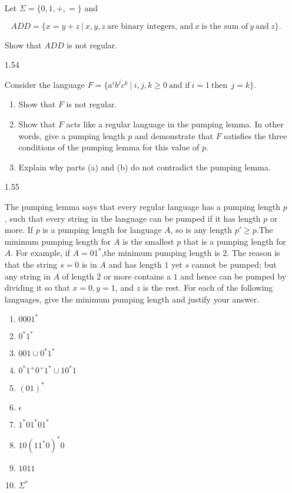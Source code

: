 \begin{enumerate}
            Let $\Sigma = \{0,1,+,=\}$ and 
            
            $$ADD = \{x=y+z~|~x,y,z~\text{are binary integers, and}~ x~ \text{is the sum of}~ y ~\text{and}~ z\}.$$
            
            Show that $ADD$ is not regular.
            
      \item [1.54]
            
            Consider the language $F = \{a^i b^j c^k ~|~ i,j,k \geq 0~ \text{and if}~ i=1~ \text{then}~~ j = k\}$. 
            \begin{enumerate}
                  \item Show that $F$ is not regular.
                  \item Show that $F$ acts like a regular language in the pumping lemma. In other words, give a pumping length $p$ and demonstrate that $F$ satisfies the three conditions of the pumping lemma for this value of $p$.
                  \item Explain why parts (a) and (b) do not contradict the pumping lemma.
                        
            \end{enumerate}
            
      \item [1.55]
            
            The pumping lemma says that every regular language has a pumping length $p$, such that every string in the language can be pumped if it has length $p$ or more. If $p$ is a pumping length for language $A$, so is any length $p' \ge p$.The minimum pumping length for $A$ is the smallest $p$ that is a pumping length for $A$. For example, if $A=01^\ast$,the minimum pumping length is 2. The reason is that the string $s = 0$ is in $A$ and has length $1$ yet $s$ cannot be pumped; but any string in $A$ of length $2$ or more contains a $1$ and hence can be pumped by dividing it so that $x = 0, y = 1$, and $z$ is the rest. For each of the following languages, give the minimum pumping length and justify your answer.
            
            \begin{enumerate}
                  \item $0001^\ast$
                  \item $0^\ast 1^\ast$
                  \item $001 \cup 0^\ast 1^\ast$
                  \item $0^\ast 1^+ 0^+ 1^\ast \cup 10^\ast1$
                  \item $(01)^\ast$
                  \item $\epsilon$
                  \item $1^\ast01^\ast01^\ast$
                  \item $10(11^\ast0)^\ast0$
                  \item $1011$
                  \item $\Sigma^\ast$
            \end{enumerate}
            

\end{enumerate}
